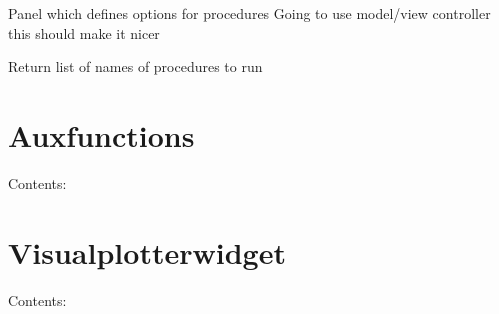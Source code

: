 \documentclass[letterpaper,10pt,english]{sphinxmanual}
\begin{document}
\begin{fulllineitems}
\label{ProcedureOptions:Optionswidgets.ProcedureOptions}
Panel which defines options for procedures
Going to use model/view controller
this should make it nicer

\begin{fulllineitems}
\label{ProcedureOptions:Optionswidgets.ProcedureOptions.get_params}
\end{fulllineitems}


\begin{fulllineitems}
\label{ProcedureOptions:Optionswidgets.ProcedureOptions.get_selected}
Return list of names of procedures to run

\end{fulllineitems}


\begin{fulllineitems}
\label{ProcedureOptions:Optionswidgets.ProcedureOptions.message}
\end{fulllineitems}


\begin{fulllineitems}
\label{ProcedureOptions:Optionswidgets.ProcedureOptions.procedure_name}
\end{fulllineitems}


\end{fulllineitems}



\chapter{Auxfunctions}
\label{Auxfunctions:auxfunctions}\label{Auxfunctions::doc}
Contents:


\chapter{Visualplotterwidget}
\label{Visualplotterwidget:visualplotterwidget}\label{Visualplotterwidget::doc}
Contents:
\end{document}
